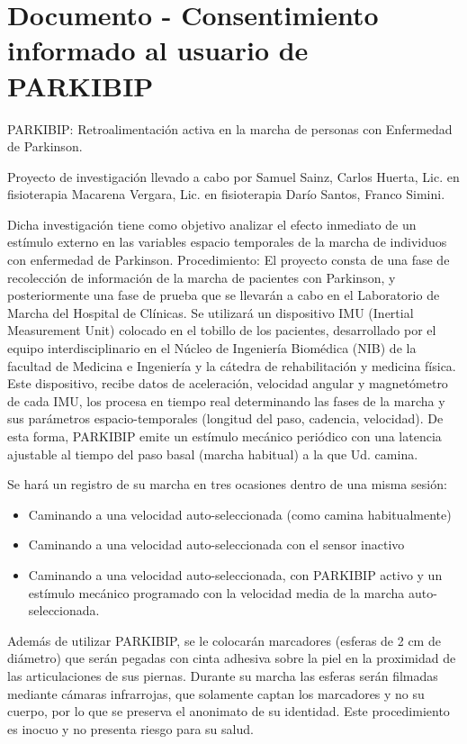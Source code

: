 \chapter{Documento - Consentimiento informado al usuario de PARKIBIP}\label{anexo:Consentimiento}

PARKIBIP: Retroalimentación activa en la marcha de personas con Enfermedad de Parkinson.  

Proyecto de investigación llevado a cabo por Samuel Sainz, Carlos Huerta, Lic. en fisioterapia Macarena Vergara, Lic. en fisioterapia  Darío Santos, Franco Simini.

Dicha investigación tiene como objetivo analizar el efecto inmediato de un estímulo externo en las variables espacio temporales de la marcha de individuos con enfermedad de Parkinson.
Procedimiento: El proyecto consta de una fase de recolección de información de la marcha de pacientes con Parkinson, y posteriormente una fase de prueba que se llevarán a cabo en el Laboratorio de Marcha del Hospital de Clínicas. Se utilizará un dispositivo IMU (Inertial Measurement Unit) colocado en el tobillo de los pacientes, desarrollado por el equipo interdisciplinario en el Núcleo de Ingeniería Biomédica (NIB) de la facultad de Medicina e Ingeniería y la cátedra de rehabilitación y medicina física. Este dispositivo, recibe datos de aceleración, velocidad angular y magnetómetro de cada IMU, los procesa en tiempo real determinando las fases de la marcha y sus parámetros espacio-temporales (longitud del paso, cadencia, velocidad). De esta forma, PARKIBIP emite un estímulo mecánico periódico con una latencia ajustable al tiempo del paso basal (marcha habitual) a la que Ud. camina.

Se hará un registro de su marcha en tres ocasiones dentro de una misma sesión:
\begin{itemize}
    \item Caminando a una velocidad auto-seleccionada (como camina habitualmente)
    \item Caminando a una velocidad auto-seleccionada con el sensor inactivo 
    \item Caminando a una velocidad auto-seleccionada, con PARKIBIP activo y un estímulo mecánico programado con la velocidad media de la marcha auto-seleccionada.
\end{itemize}

Además de utilizar PARKIBIP, se le colocarán marcadores (esferas de 2 cm de diámetro) que serán pegadas con cinta adhesiva sobre la piel en la proximidad de las articulaciones de sus piernas. Durante su marcha las esferas serán filmadas mediante cámaras infrarrojas, que solamente captan los marcadores y no su cuerpo, por lo que se preserva el anonimato de su identidad. Este procedimiento es inocuo y no presenta riesgo para su salud.

